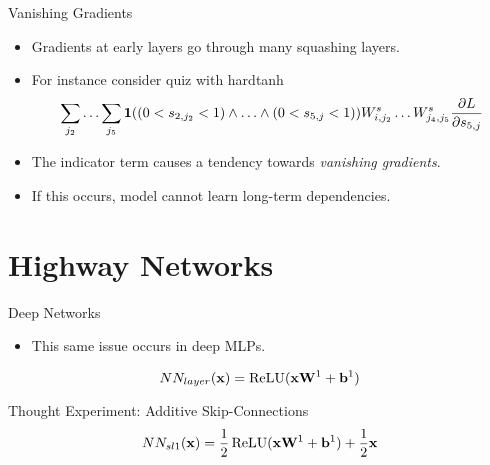\documentclass{beamer}
\begin{document}
\begin{frame}{Vanishing Gradients}
  \begin{itemize}
  \item Gradients at early layers go through many squashing layers.
    \air

  \item For instance consider quiz with  hardtanh
    \[ \sum_{j_2} \ldots \sum_{j_5} \mathbf{1}((0< s_{2, j_2} < 1)\land \ldots  \land (0<s_{5, j} < 1)) W^s_{i,j_2} \ldots W^s_{j_4,j_5}   \frac{\partial L}{\partial s_{5, j}} \]

    \air
  \item The indicator term causes a tendency towards \textit{vanishing gradients}.
   \air

  \item If this occurs, model cannot learn long-term dependencies.
 
  \end{itemize}
  
\end{frame}

\section{Highway Networks}

\begin{frame}{Deep Networks}
  \begin{itemize}
  \item This same issue occurs in deep MLPs.
  \end{itemize}
  \[NN_{layer}(\boldx) = \relu(\boldx \boldW^1 + \boldb^1)  \]
      \begin{center}
    \end{center}
\end{frame}

\begin{frame}{Thought Experiment: Additive Skip-Connections}
  \[NN_{sl1}(\boldx) = \frac{1}{2} \relu(\boldx \boldW^1 + \boldb^1) + \frac{1}{2} \boldx \]
      \begin{center}
    \end{center}
  
\end{frame}
\end{document}
